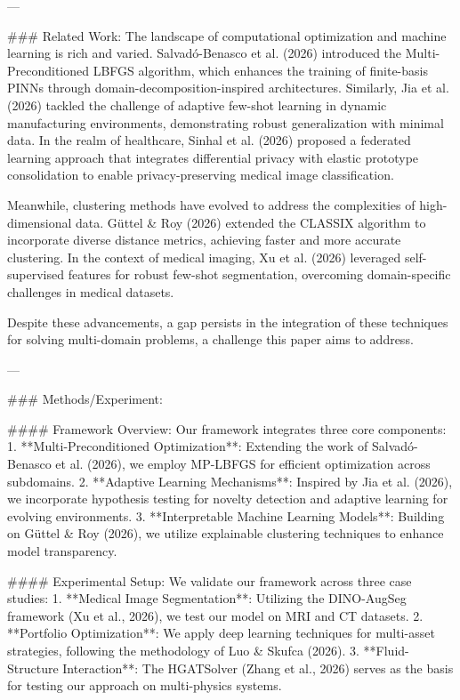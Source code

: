 ---

### Related Work:  
The landscape of computational optimization and machine learning is rich and varied. Salvadó-Benasco et al. (2026) introduced the Multi-Preconditioned LBFGS algorithm, which enhances the training of finite-basis PINNs through domain-decomposition-inspired architectures. Similarly, Jia et al. (2026) tackled the challenge of adaptive few-shot learning in dynamic manufacturing environments, demonstrating robust generalization with minimal data. In the realm of healthcare, Sinhal et al. (2026) proposed a federated learning approach that integrates differential privacy with elastic prototype consolidation to enable privacy-preserving medical image classification.  

Meanwhile, clustering methods have evolved to address the complexities of high-dimensional data. Güttel & Roy (2026) extended the CLASSIX algorithm to incorporate diverse distance metrics, achieving faster and more accurate clustering. In the context of medical imaging, Xu et al. (2026) leveraged self-supervised features for robust few-shot segmentation, overcoming domain-specific challenges in medical datasets.  

Despite these advancements, a gap persists in the integration of these techniques for solving multi-domain problems, a challenge this paper aims to address.

---

### Methods/Experiment:  

#### Framework Overview:  
Our framework integrates three core components:  
1. **Multi-Preconditioned Optimization**: Extending the work of Salvadó-Benasco et al. (2026), we employ MP-LBFGS for efficient optimization across subdomains.  
2. **Adaptive Learning Mechanisms**: Inspired by Jia et al. (2026), we incorporate hypothesis testing for novelty detection and adaptive learning for evolving environments.  
3. **Interpretable Machine Learning Models**: Building on Güttel & Roy (2026), we utilize explainable clustering techniques to enhance model transparency.

#### Experimental Setup:  
We validate our framework across three case studies:  
1. **Medical Image Segmentation**: Utilizing the DINO-AugSeg framework (Xu et al., 2026), we test our model on MRI and CT datasets.  
2. **Portfolio Optimization**: We apply deep learning techniques for multi-asset strategies, following the methodology of Luo & Skufca (2026).  
3. **Fluid-Structure Interaction**: The HGATSolver (Zhang et al., 2026) serves as the basis for testing our approach on multi-physics systems.

